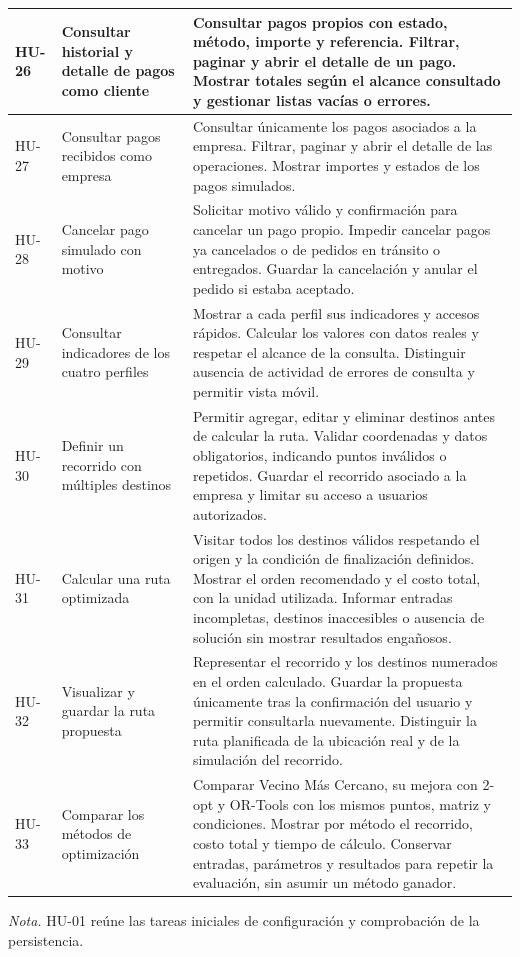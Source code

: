 \begin{longtable}{@{}>{\RaggedRight\arraybackslash}p{1.7cm}>{\RaggedRight\arraybackslash}p{3.9cm}>{\RaggedRight\arraybackslash}p{10.1cm}@{}}
		HU-26 & Consultar historial y detalle de pagos como cliente & Consultar pagos propios con estado, método, importe y referencia. Filtrar, paginar y abrir el detalle de un pago. Mostrar totales según el alcance consultado y gestionar listas vacías o errores. \\ \midrule
		HU-27 & Consultar pagos recibidos como empresa & Consultar únicamente los pagos asociados a la empresa. Filtrar, paginar y abrir el detalle de las operaciones. Mostrar importes y estados de los pagos simulados. \\ \midrule
		HU-28 & Cancelar pago simulado con motivo & Solicitar motivo válido y confirmación para cancelar un pago propio. Impedir cancelar pagos ya cancelados o de pedidos en tránsito o entregados. Guardar la cancelación y anular el pedido si estaba aceptado. \\ \midrule
		HU-29 & Consultar indicadores de los cuatro perfiles & Mostrar a cada perfil sus indicadores y accesos rápidos. Calcular los valores con datos reales y respetar el alcance de la consulta. Distinguir ausencia de actividad de errores de consulta y permitir vista móvil. \\ \midrule
		HU-30 & Definir un recorrido con múltiples destinos & Permitir agregar, editar y eliminar destinos antes de calcular la ruta. Validar coordenadas y datos obligatorios, indicando puntos inválidos o repetidos. Guardar el recorrido asociado a la empresa y limitar su acceso a usuarios autorizados. \\ \midrule
		HU-31 & Calcular una ruta optimizada & Visitar todos los destinos válidos respetando el origen y la condición de finalización definidos. Mostrar el orden recomendado y el costo total, con la unidad utilizada. Informar entradas incompletas, destinos inaccesibles o ausencia de solución sin mostrar resultados engañosos. \\ \midrule
		HU-32 & Visualizar y guardar la ruta propuesta & Representar el recorrido y los destinos numerados en el orden calculado. Guardar la propuesta únicamente tras la confirmación del usuario y permitir consultarla nuevamente. Distinguir la ruta planificada de la ubicación real y de la simulación del recorrido. \\ \midrule
		HU-33 & Comparar los métodos de optimización & Comparar Vecino Más Cercano, su mejora con 2-opt y OR-Tools con los mismos puntos, matriz y condiciones. Mostrar por método el recorrido, costo total y tiempo de cálculo. Conservar entradas, parámetros y resultados para repetir la evaluación, sin asumir un método ganador. \\ \midrule
	\end{longtable}
\endgroup
\textit{Nota.} HU-01 reúne las tareas iniciales de configuración y comprobación de la persistencia.

